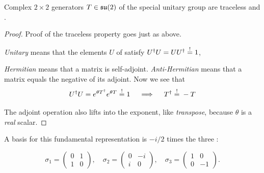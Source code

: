 \begin{proposition}
    Complex $2\times{}2$ generators $T\in\mathfrak{su}(2)$ of the special unitary group
     are traceless and
    .
\end{proposition}

\begin{proof}

    Proof of the traceless property goes just as above. 

    \textit{Unitary} means that the elements $U$ of  satisfy
    $U^\dagger U=UU^\dagger\mathrel{\stackrel{!}{=}}{1}$,

    \textit{Hermitian} means that a matrix is self-adjoint. \textit{Anti-Hermitian} means
    that a matrix equals the negative of its adjoint. Now we see that
        \begin{equation}
            {\ensuremath{U^\dagger}}{U}=e^{\theta T^\dagger}
                             e^{\theta{}T}\mathrel{\stackrel{!}{=}}{}1
                       \quad\implies\quad
                       T^\dagger\mathrel{\stackrel{!}{=}}{}-T
        \end{equation}

\noindent The adjoint operation also lifts into the exponent, like
\textit{transpose}, because $\theta$ is a \textit{real} scalar. 

\end{proof}

\noindent A basis for this fundamental
representation is $-i/2$ times the three
:

{
\small
\addtolength{\arraycolsep}{-3pt}
\begin{equation}
    \sigma_1 = \begin{pmatrix} 0 & 1 \\ 1 & 0 \end{pmatrix}, \quad
    \sigma_2 = \begin{pmatrix} 0 & -i \\ i & 0 \end{pmatrix}, \quad
    \sigma_3 = \begin{pmatrix} 1 & 0 \\ 0 & -1 \end{pmatrix}.
    \tag{Sch:3.80}
\end{equation}
}

